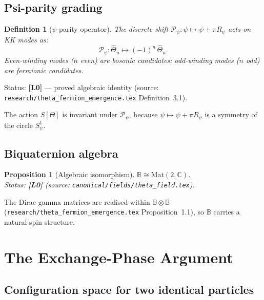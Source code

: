 \documentclass[11pt,a4paper]{article}
\newtheorem{proposition}{Proposition}
\newtheorem{definition}{Definition}
\newcommand{\Lzero}{\textbf{[L0]}}
\begin{document}
\subsection{Psi-parity grading}

\begin{definition}[$\psi$-parity operator]
\label{def:parity}
The discrete shift $\mathcal{P}_\psi\colon \psi\mapsto \psi+\pi R_\psi$ acts on
KK modes as:
\begin{equation}
  \mathcal{P}_\psi\colon \hat\Theta_n \mapsto (-1)^n\,\hat\Theta_n.
\end{equation}
Even-winding modes ($n$ even) are \emph{bosonic candidates}; odd-winding modes
($n$ odd) are \emph{fermionic candidates}.
\end{definition}

\noindent Status: \Lzero{} — proved algebraic identity
(source: \texttt{research/theta\_fermion\_emergence.tex} Definition~3.1).

The action $S[\Theta]$ is invariant under $\mathcal{P}_\psi$, because
$\psi\mapsto\psi+\pi R_\psi$ is a symmetry of the circle $S^1_\psi$.

\subsection{Biquaternion algebra}

\begin{proposition}[Algebraic isomorphism]\label{prop:iso}
$\mathbb{B}\cong\mathrm{Mat}(2,\mathbb{C})$. \\
Status: \Lzero{} (source: \texttt{canonical/fields/theta\_field.tex}).
\end{proposition}

The Dirac gamma matrices are realised within $\mathbb{B}\otimes\mathbb{B}$
(\texttt{research/theta\_fermion\_emergence.tex} Proposition~1.1), so
$\mathbb{B}$ carries a natural spin structure.

\section{The Exchange-Phase Argument}
\label{sec:exchange}

\subsection{Configuration space for two identical particles}
\end{document}
